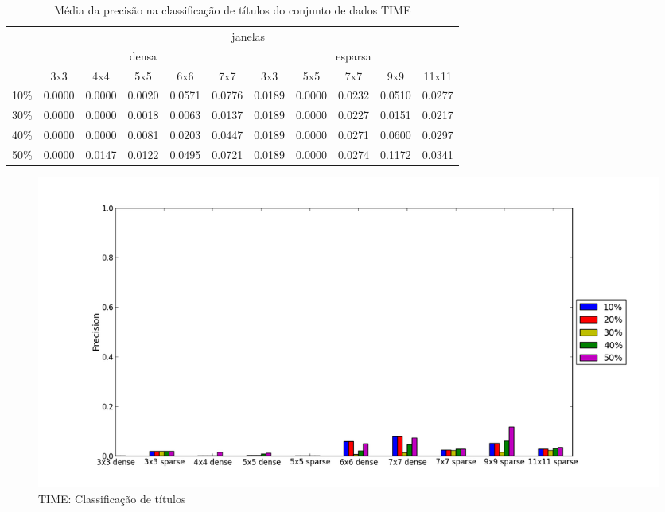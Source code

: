 \documentclass[a4paper,11pt]{article}
\begin{document}
  \begin{center}
    \begin{table}[p]
      \caption{Média da precisão na classificação de títulos do conjunto de dados TIME}
      \begin{tabular}{ l | c c c c c || c c c c c | }
        \cline{2-11}
        & \multicolumn{10}{|c|}{janelas} \\
        \cline{2-11}
        & \multicolumn{5}{c||}{densa} & \multicolumn{5}{c|}{esparsa} \\
        \cline{2-11}
        & 3x3 & 4x4 & 5x5 & 6x6 & 7x7 & 3x3 & 5x5 & 7x7 & 9x9 & 11x11 \\
        \hline
        \multicolumn{1}{|l|}{10\%}& 0.0000& 0.0000& 0.0020& 0.0571& 0.0776& 0.0189& 0.0000& 0.0232& 0.0510& 0.0277\\
        \multicolumn{1}{|l|}{30\%}& 0.0000& 0.0000& 0.0018& 0.0063& 0.0137& 0.0189& 0.0000& 0.0227& 0.0151& 0.0217\\
        \multicolumn{1}{|l|}{40\%}& 0.0000& 0.0000& 0.0081& 0.0203& 0.0447& 0.0189& 0.0000& 0.0271& 0.0600& 0.0297\\
        \multicolumn{1}{|l|}{50\%}& 0.0000& 0.0147& 0.0122& 0.0495& 0.0721& 0.0189& 0.0000& 0.0274& 0.1172& 0.0341\\
        \hline  
      \end{tabular}
      \label{tab:time_precision_heading}
    \end{table}
  \end{center}
    
  \begin{figure}[p]
    \centerline{\includegraphics[width=1.2\textwidth]{assets/experiment_charts/time_TextRegion_heading_precision.png}}
    \caption{TIME: Classificação de títulos}
    \label{fig:time_TextRegion_heading_precision}
  \end{figure}
\end{document}
